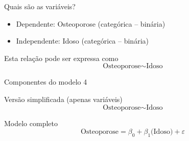 \documentclass{beamer}
\begin{document}
\begin{frame}{\scriptsize Quais são as variáveis?}
  \begin{itemize}
    \footnotesize
  \item \alert{Dependente: Osteoporose (categórica -- binária)}
  \item Independente: Idoso (categórica -- binária)
  \end{itemize}
  \vfill
  \begin{block}{Esta relação pode ser expressa como}
    \footnotesize
    \begin{displaymath}
      \text{Osteoporose} \sim \text{Idoso}
    \end{displaymath}
  \end{block}
\end{frame}

\begin{frame}{\scriptsize Componentes do modelo 4}
  \begin{block}{\footnotesize Versão simplificada (apenas variáveis)}
    \footnotesize
    \begin{displaymath}
      \text{Osteoporose} \sim \text{Idoso}
    \end{displaymath}
  \end{block}
  \bigskip
  \bigskip
  \begin{block}{Modelo completo}
    \footnotesize
    \begin{displaymath}
      \text{Osteoporose} =\beta_0 + \beta_1 \text{(Idoso)} +\varepsilon
    \end{displaymath}
  \end{block}
  \vfill
\end{frame}
\end{document}
